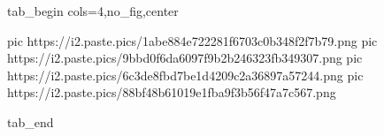  
 
 
 
 


\ifcmt
  tab_begin cols=4,no_fig,center

     pic https://i2.paste.pics/1abe884e722281f6703c0b348f2f7b79.png
		 pic https://i2.paste.pics/9bbd0f6da6097f9b2b246323fb349307.png
		 pic https://i2.paste.pics/6c3de8fbd7be1d4209c2a36897a57244.png
		 pic https://i2.paste.pics/88bf48b61019e1fba9f3b56f47a7c567.png

  tab_end
\fi
